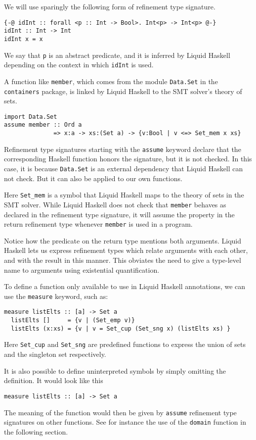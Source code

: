 \documentclass[sigconf, review]{acmart}
\newcommand{\tc}[1]{{\small\texttt{#1}}}
\begin{document}
We will use sparingly the following form of refinement type signature.
\begin{verbatim}
{-@ idInt :: forall <p :: Int -> Bool>. Int<p> -> Int<p> @-}
idInt :: Int -> Int
idInt x = x
\end{verbatim}
We say that \tc{p} is an abstract predicate, and it is inferred by Liquid Haskell
depending on the context in which \tc{idInt} is used.

A function like \tc{member}, which comes from the module \tc{Data.Set}
in the \tc{containers} package, is linked by Liquid Haskell to the
SMT solver's theory of sets.
\begin{verbatim}
import Data.Set
assume member :: Ord a
              => x:a -> xs:(Set a) -> {v:Bool | v <=> Set_mem x xs}
\end{verbatim}
Refinement type signatures starting with the \tc{assume} keyword declare that the
corresponding Haskell function honors the signature, but it is not
checked. In this case, it is because \tc{Data.Set} is an external dependency that
Liquid Haskell can not check. But it can also be applied to our own functions.

Here \tc{Set\_mem} is a symbol that Liquid Haskell maps to the theory
of sets in the SMT solver. While Liquid Haskell does not check that
\tc{member} behaves as declared in the refinement type signature,
it will assume the property in the return refinement type
whenever \tc{member} is used in a program.

Notice how the predicate on the return type mentions both arguments. Liquid
Haskell lets us express refinement types which relate arguments with each other,
and with the result in this manner. This obviates the need to
give a type-level name to arguments using existential quantification.

To define a function only available to use in Liquid Haskell annotations,
we can use the \tc{measure} keyword, such as:
\begin{verbatim}
measure listElts :: [a] -> Set a
  listElts []     = {v | (Set_emp v)}
  listElts (x:xs) = {v | v = Set_cup (Set_sng x) (listElts xs) }
\end{verbatim}
Here \tc{Set\_cup} and \tc{Set\_sng} are predefined functions to express the
union of sets and the singleton set respectively.

It is also possible to define uninterpreted symbols by simply omitting the
definition. It would look like this
\begin{verbatim}
measure listElts :: [a] -> Set a
\end{verbatim}
The meaning of the function would then be given by \tc{assume} refinement
type signatures on other functions. See for instance the use of the \tc{domain}
function in the following section.
\end{document}
